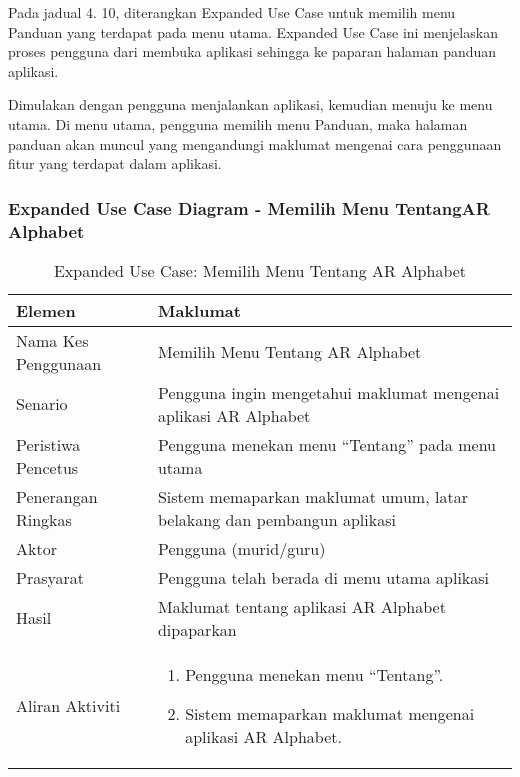 \begin{itemize}
\begin{itemize}
\begin{itemize}
\begin{itemize}
\begin{itemize}
\begin{itemize}
\begin{itemize}
\begin{itemize}
\begin{flushleft}
Pada jadual 4. 10, diterangkan Expanded Use Case untuk memilih menu Panduan yang terdapat pada menu utama. Expanded Use Case ini menjelaskan proses pengguna dari membuka aplikasi sehingga ke paparan halaman panduan aplikasi.



Dimulakan dengan pengguna menjalankan aplikasi, kemudian menuju ke menu utama. Di menu utama, pengguna memilih menu Panduan, maka halaman panduan  akan  muncul yang mengandungi maklumat mengenai cara penggunaan fitur yang terdapat  dalam aplikasi.








\subsubsection{Expanded Use Case Diagram - Memilih Menu TentangAR Alphabet}



\begin{table}[htbp]
\centering
\caption{Expanded Use Case: Memilih Menu Tentang AR Alphabet}
\begin{tabular}{lp{10cm}}
\toprule
\textbf{Elemen} & \textbf{Maklumat} \\
\midrule
Nama Kes Penggunaan & Memilih Menu Tentang AR Alphabet \\
Senario & Pengguna ingin mengetahui maklumat mengenai aplikasi AR Alphabet \\
Peristiwa Pencetus & Pengguna menekan menu “Tentang” pada menu utama \\
Penerangan Ringkas & Sistem memaparkan maklumat umum, latar belakang dan pembangun aplikasi \\
Aktor & Pengguna (murid/guru) \\
Prasyarat & Pengguna telah berada di menu utama aplikasi \\
Hasil & Maklumat tentang aplikasi AR Alphabet dipaparkan \\
Aliran Aktiviti & 
\begin{enumerate}
    \item Pengguna menekan menu “Tentang”.
    \item Sistem memaparkan maklumat mengenai aplikasi AR Alphabet.
\end{enumerate} \\
\bottomrule
\end{tabular}
\label{jadual:expanded_menu_tentang}
\end{table}



\end{flushleft}
\end{itemize}
\end{itemize}
\end{itemize}
\end{itemize}
\end{itemize}
\end{itemize}
\end{itemize}
\end{itemize}
